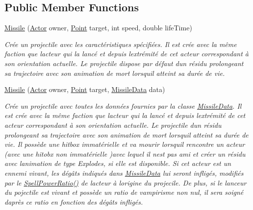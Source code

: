\subsection*{Public Member Functions}
\begin{DoxyCompactItemize}
\item 
\hyperlink{class_tentacle_slicers_1_1actors_1_1_missile_a4fa7de73c4d8aa4b6b51598ea60a4431}{Missile} (\hyperlink{class_tentacle_slicers_1_1actors_1_1_actor}{Actor} owner, \hyperlink{class_tentacle_slicers_1_1general_1_1_point}{Point} target, int speed, double life\+Time)
\begin{DoxyCompactList}\small\item\em Crée un projectile avec les caractéristiques spécifiées. Il est crée avec la même faction que l\textquotesingle{}acteur qui l\textquotesingle{}a lancé et depuis l\textquotesingle{}extrémité de cet acteur correspondant à son orientation actuelle. Le projectile dispose par défaut d\textquotesingle{}un résidu prolongeant sa trajectoire avec son animation de mort lorsqu\textquotesingle{}il atteint sa durée de vie. \end{DoxyCompactList}\item 
\hyperlink{class_tentacle_slicers_1_1actors_1_1_missile_a652c577d373d95e8ffad64b5700100b8}{Missile} (\hyperlink{class_tentacle_slicers_1_1actors_1_1_actor}{Actor} owner, \hyperlink{class_tentacle_slicers_1_1general_1_1_point}{Point} target, \hyperlink{class_tentacle_slicers_1_1actors_1_1_missile_data}{Missile\+Data} data)
\begin{DoxyCompactList}\small\item\em Crée un projectile avec toutes les données fournies par la classe \hyperlink{class_tentacle_slicers_1_1actors_1_1_missile_data}{Missile\+Data}. Il est crée avec la même faction que l\textquotesingle{}acteur qui l\textquotesingle{}a lancé et depuis l\textquotesingle{}extrémité de cet acteur correspondant à son orientation actuelle. Le projectile d\textquotesingle{}un résidu prolongeant sa trajectoire avec son animation de mort lorsqu\textquotesingle{}il atteint sa durée de vie. Il possède une hitbox immatérielle et va mourir lorsqu\textquotesingle{}il rencontre un acteur (avec une hitobx non immatérielle )avec lequel il n\textquotesingle{}est pas ami et créer un résidu avec l\textquotesingle{}animation de type Explodes, si elle est disponible. Si cet acteur est un ennemi vivant, les dégâts indiqués dans \hyperlink{class_tentacle_slicers_1_1actors_1_1_missile_data}{Missile\+Data} lui seront infligés, modifiés par le \hyperlink{class_tentacle_slicers_1_1actors_1_1_actor_a83e7b818449b5e92e3a7003c0cc6f571}{Spell\+Power\+Ratio()} de l\textquotesingle{}acteur à l\textquotesingle{}origine du projecile. De plus, si le lanceur du pojectile est vivant et possède un ratio de vampirisme non nul, il sera soigné d\textquotesingle{}après ce ratio en fonction des dégâts infligés. \end{DoxyCompactList}\item 

\end{DoxyCompactItemize}
